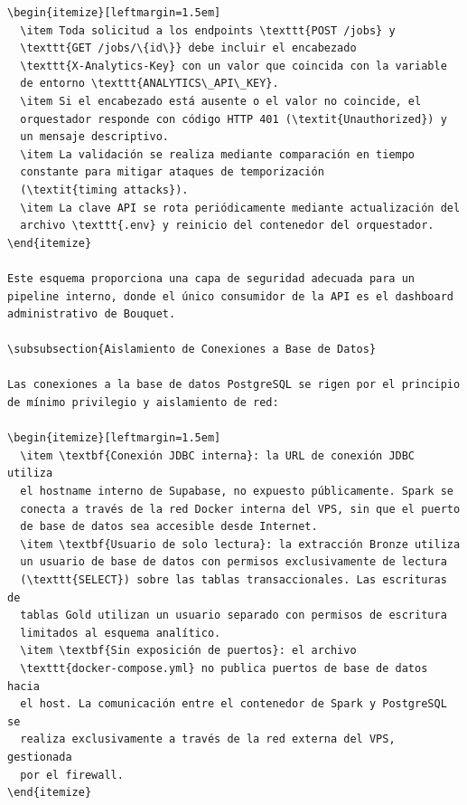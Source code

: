\begin{verbatim}
\begin{itemize}[leftmargin=1.5em]
  \item Toda solicitud a los endpoints \texttt{POST /jobs} y
  \texttt{GET /jobs/\{id\}} debe incluir el encabezado
  \texttt{X-Analytics-Key} con un valor que coincida con la variable
  de entorno \texttt{ANALYTICS\_API\_KEY}.
  \item Si el encabezado está ausente o el valor no coincide, el
  orquestador responde con código HTTP 401 (\textit{Unauthorized}) y
  un mensaje descriptivo.
  \item La validación se realiza mediante comparación en tiempo
  constante para mitigar ataques de temporización
  (\textit{timing attacks}).
  \item La clave API se rota periódicamente mediante actualización del
  archivo \texttt{.env} y reinicio del contenedor del orquestador.
\end{itemize}

Este esquema proporciona una capa de seguridad adecuada para un
pipeline interno, donde el único consumidor de la API es el dashboard
administrativo de Bouquet.

\subsubsection{Aislamiento de Conexiones a Base de Datos}

Las conexiones a la base de datos PostgreSQL se rigen por el principio
de mínimo privilegio y aislamiento de red:

\begin{itemize}[leftmargin=1.5em]
  \item \textbf{Conexión JDBC interna}: la URL de conexión JDBC utiliza
  el hostname interno de Supabase, no expuesto públicamente. Spark se
  conecta a través de la red Docker interna del VPS, sin que el puerto
  de base de datos sea accesible desde Internet.
  \item \textbf{Usuario de solo lectura}: la extracción Bronze utiliza
  un usuario de base de datos con permisos exclusivamente de lectura
  (\texttt{SELECT}) sobre las tablas transaccionales. Las escrituras de
  tablas Gold utilizan un usuario separado con permisos de escritura
  limitados al esquema analítico.
  \item \textbf{Sin exposición de puertos}: el archivo
  \texttt{docker-compose.yml} no publica puertos de base de datos hacia
  el host. La comunicación entre el contenedor de Spark y PostgreSQL se
  realiza exclusivamente a través de la red externa del VPS, gestionada
  por el firewall.
\end{itemize}


\end{verbatim}
